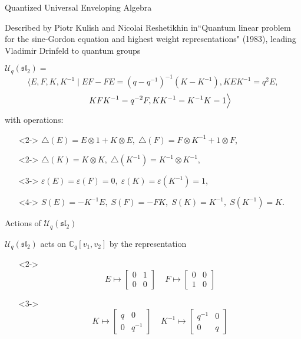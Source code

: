 \documentclass{beamer}
\begin{document}
\begin{frame}{Quantized Universal Enveloping Algebra}

Described by Piotr Kulish and Nicolai Reshetikhin in``Quantum linear problem for the sine-Gordon equation and highest weight representations" (1983), leading Vladimir Drinfeld to quantum groups\newline

$\mathcal{U}_q(\mathfrak{sl}
_2)=$
\[
\Big\langle E,F,K,K^{-1}\;\vert\;EF-FE=(q-q^{-1})^{-1}\left(K-K^{-1}\right), KEK^{-1}=q^2 E, \]\[\hspace{4ex}KFK^{-1}=q^{-2}F, KK^{-1}=K^{-1}K=1\Big\rangle
\]
with operations:
\vspace{0.5ex}
\begin{itemize}
\setlength{\itemsep}{1.5ex}
    \item[]<2-> $\triangle(E)=E\otimes 1+K\otimes E,\; \triangle(F)=F\otimes K^{-1}+ 1\otimes F$, \item[]<2-> $\triangle(K)=K\otimes K,\; \triangle(K^{-1})=K^{-1}\otimes K^{-1}$,
    \item[]<3-> $\varepsilon(E)=\varepsilon(F)=0,\; \varepsilon(K)=\varepsilon(K^{-1})=1$,
    \item[]<4-> $S(E)=-K^{-1}E,\; S(F)=-F K, \;S(K)=K^{-1},\; S(K^{-1})=K$.
\end{itemize}

\end{frame}

\begin{frame}{Actions of $\mathcal{U}_q(\mathfrak{sl}_2)$}

$\mathcal{U}_q(\mathfrak{sl}_2)$ acts on $\mathbb{C}_q[v_1,v_2]$ by the representation
\begin{itemize}
\item[]<2->\[
E\mapsto \begin{bmatrix} 0&1\\0&0\end{bmatrix}\;\;\;\; F\mapsto \begin{bmatrix} 0&0\\1&0\end{bmatrix}
\]
\item[]<3->\[
K\mapsto\begin{bmatrix}q&0\\0&q^{-1}\end{bmatrix} \;\;\;\; K^{-1}\mapsto \begin{bmatrix}q^{-1}&0\\0&q\end{bmatrix}
\]
\end{itemize}

\end{frame}
\end{document}
